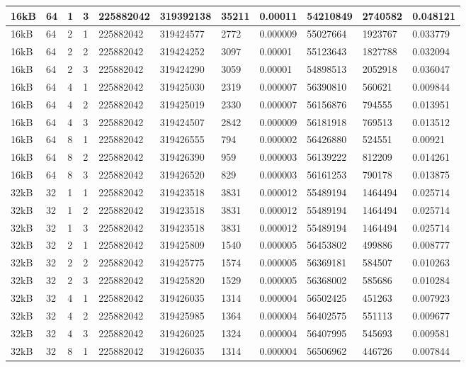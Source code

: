 \documentclass[conference]{IEEEtran}
\begin{document}
\begin{table}
\begin{tabular}{|m{.75cm} |m{.75cm} |m{.8cm} | m{.75cm} | l | l | l | l | l | l | l |}
16kB&	64&	1&	3&	225882042&	319392138&	35211 &0.00011	&  54210849 &	2740582	&0.048121 \\ \hline
16kB&	64&	2&	1&	225882042&	319424577&	2772  &0.000009&	55027664	&1923767	&0.033779 \\ \hline
16kB&	64&	2&	2&	225882042&	319424252&	3097  &0.00001	&  55123643 &	1827788	&0.032094 \\ \hline
16kB&	64&	2&	3&	225882042&	319424290&	3059  &0.00001	&  54898513 &	2052918	&0.036047 \\ \hline
16kB&	64&	4&	1&	225882042&	319425030&	2319  &0.000007&	56390810	&560621	  &0.009844 \\ \hline
16kB&	64&	4&	2&	225882042&	319425019&	2330  &0.000007&	56156876	&794555	  &0.013951 \\ \hline
16kB&	64&	4&	3&	225882042&	319424507&	2842  &0.000009&	56181918	&769513	  &0.013512 \\ \hline
16kB&	64&	8&	1&	225882042&	319426555&	794	  &0.000002&	56426880	&524551	  &0.00921  \\ \hline
16kB&	64&	8&	2&	225882042&	319426390&	959	  &0.000003&	56139222	&812209	  &0.014261 \\ \hline
16kB&	64&	8&	3&	225882042&	319426520&	829	  &0.000003&	56161253	&790178	  &0.013875 \\ \hline
32kB&	32&	1&	1&	225882042&	319423518&	3831  &0.000012&	55489194	&1464494	&0.025714 \\ \hline
32kB&	32&	1&	2&	225882042&	319423518&	3831  &0.000012&	55489194	&1464494	&0.025714 \\ \hline
32kB&	32&	1&	3&	225882042&	319423518&	3831  &0.000012&	55489194	&1464494	&0.025714 \\ \hline
32kB&	32&	2&	1&	225882042&	319425809&	1540  &0.000005&	56453802	&499886	  &0.008777 \\ \hline
32kB&	32&	2&	2&	225882042&	319425775&	1574  &0.000005&	56369181	&584507	  &0.010263 \\ \hline
32kB&	32&	2&	3&	225882042&	319425820&	1529  &0.000005&	56368002	&585686	  &0.010284 \\ \hline
32kB&	32&	4&	1&	225882042&	319426035&	1314  &0.000004&	56502425	&451263	  &0.007923 \\ \hline
32kB&	32&	4&	2&	225882042&	319425985&	1364  &	0.000004  &	56402575  &	551113	&0.009677 \\ \hline
32kB&	32&	4&	3&	225882042&	319426025&	1324  &	0.000004  &	56407995  &	545693	&0.009581 \\ \hline
32kB&	32&	8&	1&	225882042&	319426035&	1314  &	0.000004  &	56506962  &	446726	&0.007844 \\ \hline

\end{tabular}
\end{table}
\end{document}

